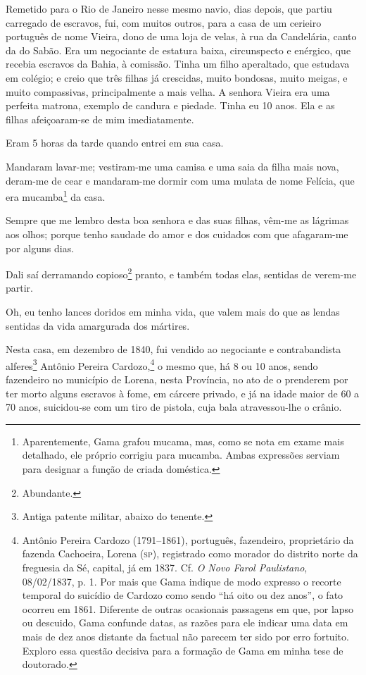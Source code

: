 Remetido para o Rio de Janeiro nesse mesmo navio, dias depois, que
partiu carregado de escravos, fui, com muitos outros, para a casa de um
cerieiro português de nome Vieira, dono de uma loja de velas, à rua da
Candelária, canto da do Sabão. Era um negociante de estatura baixa,
circunspecto e enérgico, que recebia escravos da Bahia, à comissão.
Tinha um filho aperaltado, que estudava em colégio; e creio que três
filhas já crescidas, muito bondosas, muito meigas, e muito compassivas,
principalmente a mais velha. A senhora Vieira era uma perfeita matrona,
exemplo de candura e piedade. Tinha eu 10 anos. Ela e as filhas
afeiçoaram-se de mim imediatamente.

Eram 5 horas da tarde quando entrei em sua casa.

Mandaram lavar-me; vestiram-me uma camisa e uma saia da filha mais nova,
deram-me de cear e mandaram-me dormir com uma mulata de nome Felícia,
que era mucamba\footnote{Aparentemente, Gama grafou mucama, mas, como
  se nota em exame mais detalhado, ele próprio corrigiu para mucamba.
  Ambas expressões serviam para designar a função de criada doméstica.}
da casa.

Sempre que me lembro desta boa senhora e das suas filhas, vêm-me as
lágrimas aos olhos; porque tenho saudade do amor e dos cuidados com que
afagaram-me por alguns dias.

Dali saí derramando copioso\footnote{Abundante.} pranto, e também
todas elas, sentidas de verem-me partir.

Oh, eu tenho lances doridos em minha vida, que valem mais do que as
lendas sentidas da vida amargurada dos mártires.

Nesta casa, em dezembro de 1840, fui vendido ao negociante e
contrabandista alferes\footnote{Antiga patente militar, abaixo do
  tenente.} Antônio Pereira Cardozo,\footnote{Antônio Pereira Cardozo \label{cardozo}
  (1791--1861), português, fazendeiro, proprietário da fazenda Cachoeira,
  Lorena (\textsc{sp}), registrado como morador do distrito norte da freguesia da
  Sé, capital, já em 1837. Cf. \emph{O Novo Farol Paulistano},
  08/02/1837, p. 1. Por mais que Gama indique de modo expresso o
  recorte temporal do suicídio de Cardozo como sendo ``há oito ou dez
  anos'', o fato ocorreu em 1861. Diferente de outras ocasionais
  passagens em que, por lapso ou descuido, Gama confunde datas, as razões
  para ele indicar uma data em mais de dez anos distante da factual não
  parecem ter sido por erro fortuito. Exploro essa questão decisiva para
  a formação de Gama em minha tese de doutorado.} o mesmo que, há 8 ou %
10 anos, sendo fazendeiro no município de Lorena, nesta Província, no
ato de o prenderem por ter morto alguns escravos à fome, em cárcere
privado, e já na idade maior de 60 a 70 anos, suicidou-se com um tiro de
pistola, cuja bala atravessou-lhe o crânio.

